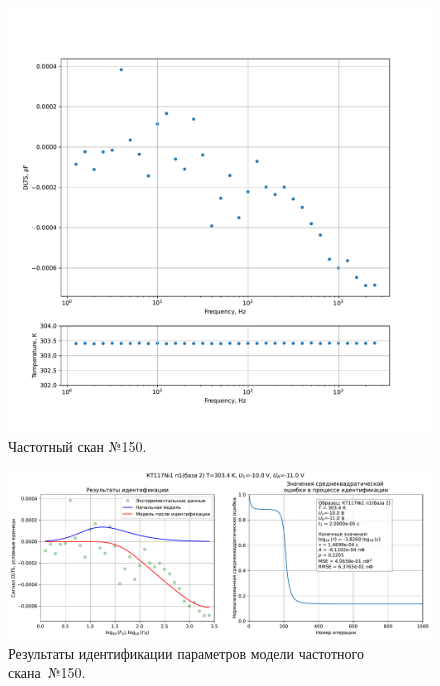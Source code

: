 \begin{figure}[!ht]
    \centering
    \includegraphics[width=1\textwidth]{../plots/КТ117№1_п1(база 2)_2500Гц-1Гц_1пФ_+30С_-10В-11В_10мВ_20мкс_шаг_0,1.pdf}
    \caption{Частотный скан №150.}
    \label{pic:frequency_scan_150}
\end{figure}

\begin{figure}[!ht]
    \centering
    \includegraphics[width=1\textwidth]{../plots/КТ117№1_п1(база 2)_2500Гц-1Гц_1пФ_+30С_-10В-11В_10мВ_20мкс_шаг_0,1_model.pdf}
    \caption{Результаты идентификации параметров модели частотного скана~№150.}
    \label{pic:frequency_scan_model150}
\end{figure}

\pagebreak


